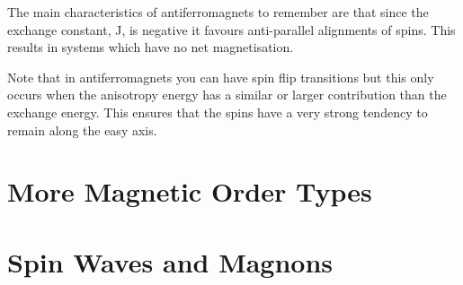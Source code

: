 \noindent The main characteristics of antiferromagnets to remember are that since the exchange constant, J, is negative it favours anti-parallel alignments of spins. This results in systems which have no net magnetisation.

\noindent Note that in antiferromagnets you can have spin flip transitions but this only occurs when the anisotropy energy has a similar or larger contribution than the exchange energy. This ensures that the spins have a very strong tendency to remain along the easy axis.

\section{More Magnetic Order Types}

\section{Spin Waves and Magnons}